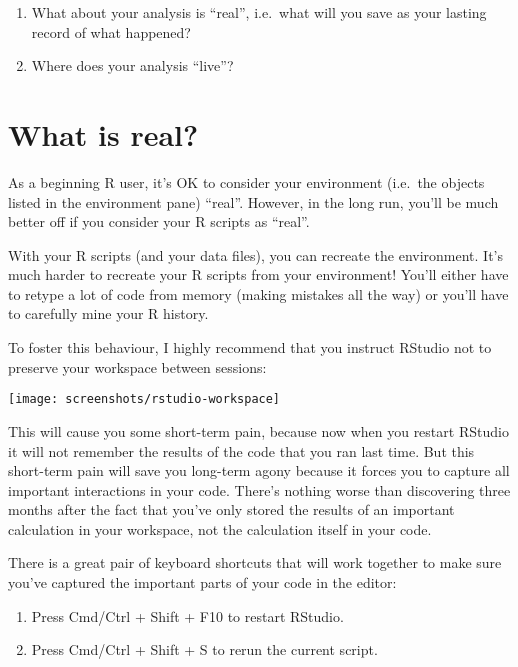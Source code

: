\documentclass[]{book}
\providecommand{\tightlist}{%
  \setlength{\itemsep}{0pt}\setlength{\parskip}{0pt}}
\begin{document}
\begin{enumerate}
\def\labelenumi{\arabic{enumi}.}
\item
  What about your analysis is ``real'', i.e.~what will you save as your
  lasting record of what happened?
\item
  Where does your analysis ``live''?
\end{enumerate}

\section{What is real?}\label{what-is-real}

As a beginning R user, it's OK to consider your environment (i.e.~the
objects listed in the environment pane) ``real''. However, in the long
run, you'll be much better off if you consider your R scripts as
``real''.

With your R scripts (and your data files), you can recreate the
environment. It's much harder to recreate your R scripts from your
environment! You'll either have to retype a lot of code from memory
(making mistakes all the way) or you'll have to carefully mine your R
history.

To foster this behaviour, I highly recommend that you instruct RStudio
not to preserve your workspace between sessions:

\begin{center}\texttt{[image: screenshots/rstudio-workspace]} \end{center}

This will cause you some short-term pain, because now when you restart
RStudio it will not remember the results of the code that you ran last
time. But this short-term pain will save you long-term agony because it
forces you to capture all important interactions in your code. There's
nothing worse than discovering three months after the fact that you've
only stored the results of an important calculation in your workspace,
not the calculation itself in your code.

There is a great pair of keyboard shortcuts that will work together to
make sure you've captured the important parts of your code in the
editor:

\begin{enumerate}
\def\labelenumi{\arabic{enumi}.}
\tightlist
\item
  Press Cmd/Ctrl + Shift + F10 to restart RStudio.
\item
  Press Cmd/Ctrl + Shift + S to rerun the current script.
\end{enumerate}
\end{document}
